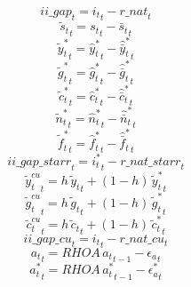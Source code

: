 \begin{dmath}
{ii\_gap}_{t}={{i_t}}_{t}-{r\_nat}_{t}
\end{dmath}
\begin{dmath}
{{\tilde s_t}}_{t}={{s_t}}_{t}-{{\bar s_t}}_{t}
\end{dmath}
\begin{dmath}
{{\tilde y_t^*}}_{t}={{\hat y_t^*}}_{t}-{{\hat {\bar y}_t^*}}_{t}
\end{dmath}
\begin{dmath}
{{\tilde g_t^*}}_{t}={{\hat g_t^*}}_{t}-{{\hat {\bar g}_t^*}}_{t}
\end{dmath}
\begin{dmath}
{{\tilde c_t^*}}_{t}={{\hat c_t^*}}_{t}-{{\hat {\bar c}_t^*}}_{t}
\end{dmath}
\begin{dmath}
{{\tilde n_t^*}}_{t}={{\hat n_t^*}}_{t}-{{\hat {\bar n}_t^*}}_{t}
\end{dmath}
\begin{dmath}
{{\tilde f_t^*}}_{t}={{\hat f_t^*}}_{t}-{{\hat {\bar f}_t^*}}_{t}
\end{dmath}
\begin{dmath}
{ii\_gap\_starr}_{t}={{i_t^*}}_{t}-{r\_nat\_starr}_{t}
\end{dmath}
\begin{dmath}
{{\tilde y_t^{cu}}}_{t}={h}\, {{\tilde y_t}}_{t}+\left(1-{h}\right)\, {{\tilde y_t^*}}_{t}
\end{dmath}
\begin{dmath}
{{\tilde g_t^{cu}}}_{t}={h}\, {{\tilde g_t}}_{t}+\left(1-{h}\right)\, {{\tilde g_t^*}}_{t}
\end{dmath}
\begin{dmath}
{{\tilde c_t^{cu}}}_{t}={h}\, {{\tilde c_t}}_{t}+\left(1-{h}\right)\, {{\tilde c_t^*}}_{t}
\end{dmath}
\begin{dmath}
{ii\_gap\_cu}_{t}={{i_t}}_{t}-{r\_nat\_cu}_{t}
\end{dmath}
\begin{dmath}
{{a_t}}_{t}={RHOA}\, {{a_t}}_{t-1}-{{\epsilon_a}}_{t}
\end{dmath}
\begin{dmath}
{{a_t^*}}_{t}={RHOA}\, {{a_t^*}}_{t-1}-{{\epsilon_a^*}}_{t}
\end{dmath}
